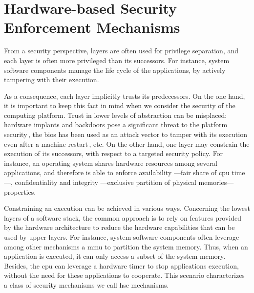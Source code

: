 \section{Hardware-based Security Enforcement Mechanisms}

From a security perspective, layers are often used for privilege separation, and
each layer is often more privileged than its successors.
%
For instance, system software components manage the life cycle of the
applications, by actively tampering  with their execution.

As a consequence, each layer implicitly trusts its predecessors.
%
On the one hand, it is important to keep this fact in mind when we consider the
security of the computing platform.
%
Trust in lower levels of abstraction can be misplaced: hardware implants and
backdoors pose a significant threat to the platform security\,\cite{yang2016a2},
the \ac{bios} has been used as an attack vector to tamper with its execution 
even after a machine restart\,\cite{embleton2013smm}, etc.
%
On the other hand, one layer may constrain the execution of its successors, with
respect to a targeted security policy.
%
For instance, an operating system shares hardware resources among several
applications, and therefore  is able to enforce availability ---fair share of
\ac{cpu} time---, confidentiality and integrity ---exclusive partition of
physical memories--- properties.

Constraining an execution can be achieved in various ways.
%
Concerning the lowest layers of a software stack, the common approach is to rely
on features provided by the hardware architecture to reduce the hardware
capabilities that can be used by upper layers.
%
For instance, system software components often leverage among other mechanisms a
\ac{mmu} to partition the system memory.
%
Thus, when an application is executed, it can only access a subset of the system
memory.
%
Besides, the \ac{cpu} can leverage a hardware timer to stop applications
execution, without the need for these applications to cooperate.
%
This scenario characterizes a class of security mechanisms we call \ac{hse}
mechanisms.


